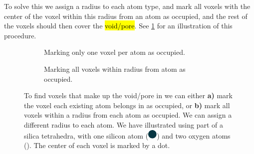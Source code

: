 To solve this we assign a radius to each atom type, and mark all voxels with the center of the voxel within this radius from an atom as occupied, and the rest of the voxels should then cover the \hl{void/pore}. See \cref{fig:inject_empty_voxel} for an illustration of this procedure. 
%
\begin{figure}[htpb]%
    \centering%
    \begin{subfigure}[b]{0.45\textwidth}%
        \caption{Marking only one voxel per atom as occupied.}%
    \end{subfigure}%
    \hspace{0.05\textwidth}%
    \begin{subfigure}[b]{0.45\textwidth}%
        \caption{Marking all voxels within radius from atom as occupied.}%
    \end{subfigure}%
    \caption[
        To find voxels that make up the void/pore in we can either \textbf{a)} mark the voxel each existing atom belongs in as occupied, or \textbf{b)} mark all voxels within a radius from each atom as occupied. We can assign a different radius to each atom. We have illustrated using part of a silica tetrahedra, with one silicon atom (the large blue dot) and two oxygen atoms (the smaller red dot). The center of each voxel is marked by a dot 
    ]{%
        To find voxels that make up the void/pore in we can either \textbf{a)} mark the voxel each existing atom belongs in as occupied, or \textbf{b)} mark all voxels within a radius from each atom as occupied. We can assign a different radius to each atom. We have illustrated using part of a silica tetrahedra, with one silicon atom (\includegraphics[scale=0.8]{./images/inject_water/silicon.pdf}) and two oxygen atoms (). The center of each voxel is marked by a dot. %
    }%
    \label{fig:inject_empty_voxel}%
\end{figure}%

